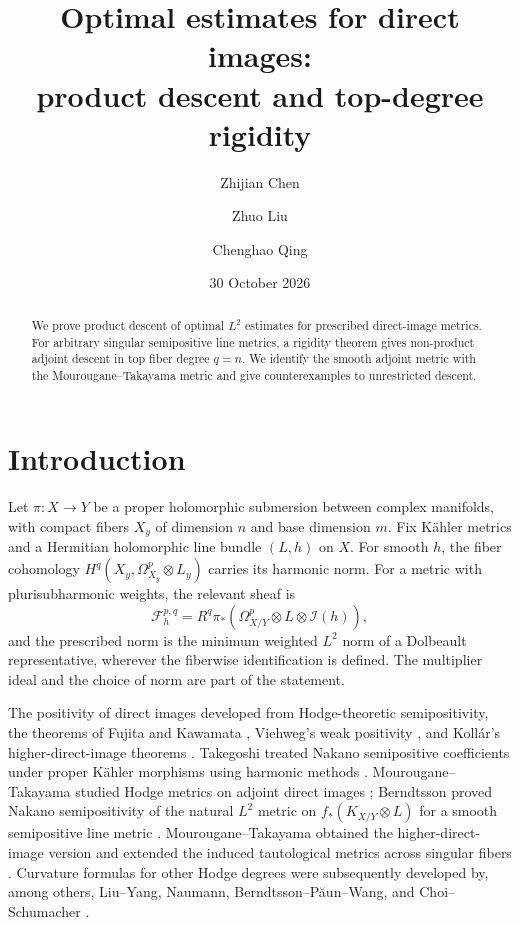 \documentclass[11pt,reqno]{amsart}
\title[Optimal estimates and top-degree rigidity]
{Optimal estimates for direct images:\\ product descent and top-degree rigidity}
\author{Zhijian Chen}
\author{Zhuo Liu}
\author{Chenghao Qing}
\date{30 October 2026}
\numberwithin{equation}{section}
\theoremstyle{definition}
\theoremstyle{remark}
\begin{document}
\begin{abstract}
We prove product descent of optimal $L^2$ estimates for prescribed
direct-image metrics.  For arbitrary singular semipositive line metrics,
a rigidity theorem gives non-product adjoint descent in top fiber degree $q=n$.
We identify the smooth adjoint metric with the Mourougane--Takayama
metric and give counterexamples to unrestricted descent.
\end{abstract}
\maketitle
\enlargethispage{8pt}
\tableofcontents

\section{Introduction}\label{sec:introduction}

Let $\pi:X\to Y$ be a proper holomorphic submersion between complex
manifolds, with compact
fibers $X_y$ of dimension $n$ and base dimension $m$.  Fix K\"ahler
metrics and a Hermitian holomorphic line bundle $(L,h)$ on $X$.
For smooth $h$, the fiber cohomology
$H^q(X_y,\Omega_{X_y}^p\otimes L_y)$ carries its harmonic norm.
For a metric with plurisubharmonic weights, the relevant sheaf is
\[
 \mathcal F^{p,q}_h
 =R^q\pi_*(\Omega_{X/Y}^p\otimes L\otimes\mathcal I(h)),
\]
and the prescribed norm is the minimum weighted $L^2$ norm of a
Dolbeault representative, wherever the fiberwise identification is
defined.  The multiplier ideal and the choice of norm are part of the
statement.

The positivity of direct images developed from Hodge-theoretic
semipositivity, the theorems of Fujita and Kawamata
\cite{Fuj78,Kaw81}, Viehweg's weak positivity \cite{Vie83}, and
Koll\'ar's higher-direct-image theorems \cite{Kol86a,Kol86b}.
Takegoshi treated Nakano semipositive coefficients under proper
K\"ahler morphisms using harmonic methods \cite{Take95}.
Mourougane--Takayama studied Hodge metrics on adjoint direct images
\cite{MT07}; Berndtsson proved Nakano semipositivity of the natural
$L^2$ metric on $f_*(K_{X/Y}\otimes L)$ for a smooth semipositive
line metric \cite{Ber09}.
Mourougane--Takayama obtained the higher-direct-image version
\cite{MT08} and extended the induced tautological metrics across
singular fibers \cite{MT09}.
Curvature formulas for other Hodge degrees were subsequently developed
by, among others, Liu--Yang, Naumann, Berndtsson--P\u aun--Wang,
and Choi--Schumacher \cite{LY14,Nau21,BPW22,CS24}.
\end{document}

